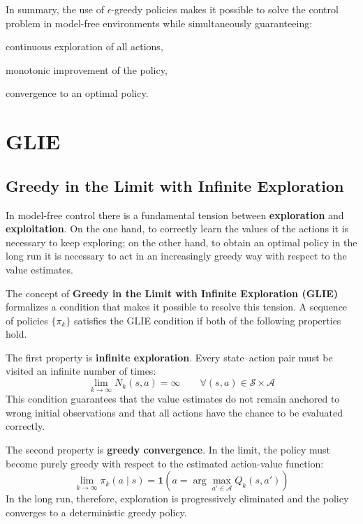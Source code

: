 In summary, the use of $\epsilon$-greedy policies makes it possible to solve the control problem in model-free environments while simultaneously guaranteeing:
\begin{compactitemize}
    \item continuous exploration of all actions,
    \item monotonic improvement of the policy,
    \item convergence to an optimal policy.
\end{compactitemize}

\section{GLIE}

\subsection{Greedy in the Limit with Infinite Exploration}

In model-free control there is a fundamental tension between \textbf{exploration} and \textbf{exploitation}. On the one hand, to correctly learn the values of the actions it is necessary to keep exploring; on the other hand, to obtain an optimal policy in the long run it is necessary to act in an increasingly greedy way with respect to the value estimates.

The concept of \textbf{Greedy in the Limit with Infinite Exploration (GLIE)} formalizes a condition that makes it possible to resolve this tension. A sequence of policies $\{\pi_k\}$ satisfies the GLIE condition if both of the following properties hold.

The first property is \textbf{infinite exploration}. Every state–action pair must be visited an infinite number of times:
\[
\lim_{k \to \infty} N_k(s,a) = \infty \qquad \forall (s,a) \in \mathcal{S} \times \mathcal{A}
\]
This condition guarantees that the value estimates do not remain anchored to wrong initial observations and that all actions have the chance to be evaluated correctly.

The second property is \textbf{greedy convergence}. In the limit, the policy must become purely greedy with respect to the estimated action-value function:
\[
\lim_{k \to \infty} \pi_k(a \mid s)
=
\mathbf{1}\!\left(
a = \arg\max_{a' \in \mathcal{A}} Q_k(s,a')
\right)
\]
In the long run, therefore, exploration is progressively eliminated and the policy converges to a deterministic greedy policy.

